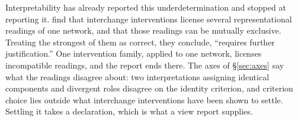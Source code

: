 
Interpretability has already reported this underdetermination and stopped at
reporting it.  \citet{milliere2024} find that interchange interventions license
several representational readings of one network, and that those readings can be
mutually exclusive.  Treating the strongest of them as correct, they conclude,
``requires further justification.''  One intervention family, applied to one
network, licenses incompatible readings, and the report ends there.  The axes of
\S\ref{sec:axes} say what the readings disagree about: two interpretations
assigning identical components and divergent roles disagree on the identity
criterion, and criterion choice lies outside what interchange interventions have
been shown to settle.  Settling it takes a declaration, which is what a view
report supplies.
